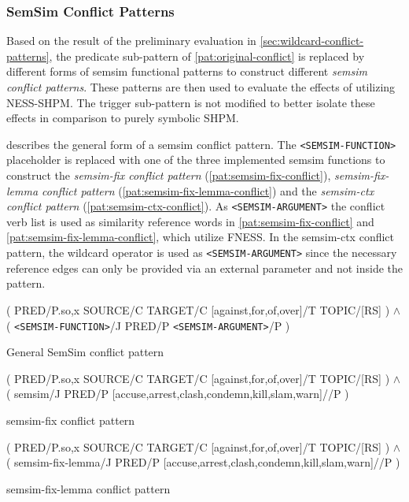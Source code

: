 \documentclass[11pt]{scrreprt}
\begin{document}
\subsubsection{SemSim Conflict Patterns}
Based on the result of the preliminary evaluation in \cref{sec:wildcard-conflict-patterns}, the predicate sub-pattern of \cref{pat:original-conflict} is replaced by different forms of semsim functional patterns to construct different \textit{semsim conflict patterns}. These patterns are then used to evaluate the effects of utilizing NESS-SHPM. The trigger sub-pattern is not modified to better isolate these effects in comparison to purely symbolic SHPM.

 describes the general form of a semsim conflict pattern. The \texttt{<SEMSIM-FUNCTION>} placeholder is replaced with one of the three implemented semsim functions to construct the \textit{semsim-fix conflict pattern} (\cref{pat:semsim-fix-conflict}), \textit{semsim-fix-lemma conflict pattern} (\cref{pat:semsim-fix-lemma-conflict}) and the \textit{semsim-ctx conflict pattern} (\cref{pat:semsim-ctx-conflict}). As \texttt{<SEMSIM-ARGUMENT>} the conflict verb list is used as similarity reference words in \cref{pat:semsim-fix-conflict} and \cref{pat:semsim-fix-lemma-conflict}, which utilize FNESS. In the semsim-ctx conflict pattern, the wildcard operator is used as \texttt{<SEMSIM-ARGUMENT>} since the necessary reference edges can only be provided via an external parameter and not inside the pattern.


\begin{pattern}[H]
  \normalfont\sffamily
  \centering
  ( PRED/P.{so,x} SOURCE/C TARGET/C [against,for,of,over]/T TOPIC/[RS] ) \(\wedge\)\\ 
  ( \texttt{<SEMSIM-FUNCTION>}/J PRED/P \texttt{<SEMSIM-ARGUMENT>}/P )
  \caption{General SemSim conflict pattern}
  \label{pat:semsim-conflict}
\end{pattern}

\begin{pattern}[H]
  \normalfont\sffamily
  \centering
  ( PRED/P.{so,x} SOURCE/C TARGET/C [against,for,of,over]/T TOPIC/[RS] ) \(\wedge\)\\ 
  ( semsim/J PRED/P [accuse,arrest,clash,condemn,kill,slam,warn]//P )
  \caption{semsim-fix conflict pattern}
  \label{pat:semsim-fix-conflict}
\end{pattern}

\begin{pattern}[H]
  \normalfont\sffamily
  \centering
  ( PRED/P.{so,x} SOURCE/C TARGET/C [against,for,of,over]/T TOPIC/[RS] ) \(\wedge\)\\ 
  ( semsim-fix-lemma/J PRED/P [accuse,arrest,clash,condemn,kill,slam,warn]//P )
  \caption{semsim-fix-lemma conflict pattern}
  \label{pat:semsim-fix-lemma-conflict}
\end{pattern}
\end{document}
